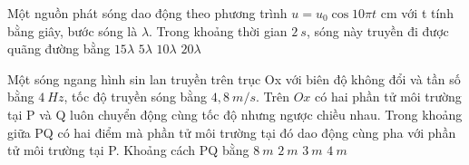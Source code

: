 	\begin{ex}%
		Một nguồn phát sóng dao động theo phương trình $u=u_0\cos10\pi t$ cm với t tính bằng giây, bước sóng là $\lambda$. Trong khoảng thời gian $2\ s$, sóng này truyền đi được quãng đường bằng
		\choice
		{$15\lambda$}
		{$5\lambda$}
		{\True $10\lambda$}
		{$20\lambda$}
	\end{ex}
	
	\begin{ex}%
		Một sóng ngang hình sin lan truyền trên trục Ox với biên độ không đổi và tần số bằng $4\ Hz$, tốc độ truyền sóng bằng $4,8\ m/s$. Trên $Ox$ có hai phần tử môi trường tại P và Q luôn chuyển động cùng tốc độ nhưng ngược chiều nhau. Trong khoảng giữa PQ có hai điểm mà phần tử môi trường tại đó dao động cùng pha với phần tử môi trường tại P. Khoảng cách PQ bằng
		\choice
		{$8\ m$}
		{$2\ m$}
		{\True $3\ m$}
		{$4\ m$}
	\end{ex}
	
